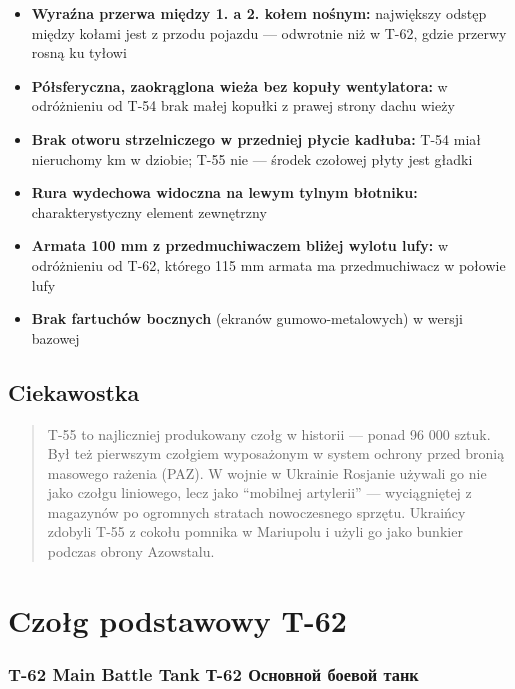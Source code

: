 \documentclass[12pt,oneside]{book}
\providecommand{\tightlist}{%
  \setlength{\itemsep}{0pt}\setlength{\parskip}{0pt}}
\begin{document}
\begin{itemize}
\tightlist
\item
  \textbf{Wyraźna przerwa między 1. a 2. kołem nośnym:} największy
  odstęp między kołami jest z przodu pojazdu --- odwrotnie niż w T-62,
  gdzie przerwy rosną ku tyłowi
\item
  \textbf{Półsferyczna, zaokrąglona wieża bez kopuły wentylatora:} w
  odróżnieniu od T-54 brak małej kopułki z prawej strony dachu wieży
\item
  \textbf{Brak otworu strzelniczego w przedniej płycie kadłuba:} T-54
  miał nieruchomy km w dziobie; T-55 nie --- środek czołowej płyty jest
  gładki
\item
  \textbf{Rura wydechowa widoczna na lewym tylnym błotniku:}
  charakterystyczny element zewnętrzny
\item
  \textbf{Armata 100 mm z przedmuchiwaczem bliżej wylotu lufy:} w
  odróżnieniu od T-62, którego 115 mm armata ma przedmuchiwacz w połowie
  lufy
\item
  \textbf{Brak fartuchów bocznych} (ekranów gumowo-metalowych) w wersji
  bazowej
\end{itemize}

\subsection{Ciekawostka}\label{ciekawostka}

\begin{quote}
T-55 to najliczniej produkowany czołg w historii --- ponad 96 000 sztuk.
Był też pierwszym czołgiem wyposażonym w system ochrony przed bronią
masowego rażenia (PAZ). W wojnie w Ukrainie Rosjanie używali go nie jako
czołgu liniowego, lecz jako ``mobilnej artylerii'' --- wyciągniętej z
magazynów po ogromnych stratach nowoczesnego sprzętu. Ukraińcy zdobyli
T-55 z cokołu pomnika w Mariupolu i użyli go jako bunkier podczas obrony
Azowstalu.
\end{quote}

\section{Czołg podstawowy T-62}\label{czoux142g-podstawowy-t-62}

\subsubsection{T-62 Main Battle Tank \textbar{} Т-62 Основной боевой
танк}\label{t-62-main-battle-tank-ux442-62-ux43eux441ux43dux43eux432ux43dux43eux439-ux431ux43eux435ux432ux43eux439-ux442ux430ux43dux43a}
\end{document}
